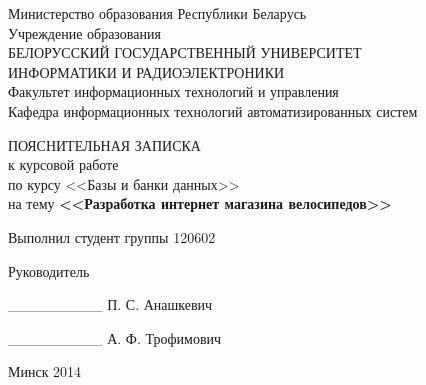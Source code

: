 \begin{titlepage}
\thispagestyle{empty}
\setlength{\parindent}{0ex} %

\begin{center}
  Министерство образования Республики Беларусь \\
  \smallskip
  Учреждение образования \\
  БЕЛОРУССКИЙ ГОСУДАРСТВЕННЫЙ УНИВЕРСИТЕТ \\
  ИНФОРМАТИКИ И РАДИОЭЛЕКТРОНИКИ \\
  \smallskip
  Факультет информационных технологий и управления \\
  \smallskip
  Кафедра информационных технологий автоматизированных систем
\end{center}

\vspace{50mm}

\begin{center}
  ПОЯСНИТЕЛЬНАЯ ЗАПИСКА \\
  к курсовой работе \\
  по курсу <<Базы и банки данных>> \\
  на тему \textbf{<<Разработка интернет магазина велосипедов>>} \\
\end{center}

\vspace{49mm}

\begin{minipage}{.55\linewidth}
    Выполнил студент группы 120602

    \smallskip

    Руководитель
\end{minipage}
\hfill
\begin{minipage}{.4\linewidth}
  \begin{flushright}
    \_\_\_\_\_\_\_\_\_ \hspace{1.7mm} П. С. Анашкевич

    \smallskip

    \_\_\_\_\_\_\_\_\_ А. Ф. Трофимович
  \end{flushright}
\end{minipage}

\vspace{50mm}
\begin{center}
  Минск 2014
\end{center}

\setlength{\parindent}{5ex} %
\end{titlepage}
